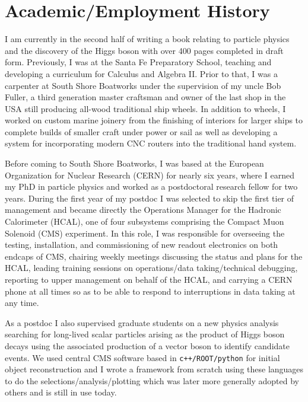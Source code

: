 \documentclass[10pt]{article} %
\begin{document}
\section{Academic/Employment History}

I am currently in the second half of writing a book relating to particle physics and the discovery of the Higgs boson with over 400 pages completed in draft form. Previously, I was at the Santa Fe Preparatory School, teaching and developing a curriculum for Calculus and Algebra II. Prior to that, I was a carpenter at South Shore Boatworks under the supervision of my uncle Bob Fuller, a third generation master craftsman and owner of the last shop in the USA still producing all-wood traditional ship wheels. In addition to wheels, I worked on custom marine joinery from the finishing of interiors for larger ships to complete builds of smaller craft under power or sail as well as developing a system for incorporating modern CNC routers into the traditional hand system.

\vspace{5pt}

Before coming to South Shore Boatworks, I was based at the European Organization for Nuclear Research (CERN) for nearly six years, where I earned my PhD in particle physics and worked as a postdoctoral research fellow for two years. During the first year of my postdoc I was selected to skip the first tier of management and became directly the Operations Manager for the Hadronic Calorimeter (HCAL), one of four subsystems comprising the Compact Muon Solenoid (CMS) experiment. In this role, I was responsible for overseeing the testing, installation, and commissioning of new readout electronics on both endcaps of CMS, chairing weekly meetings discussing the status and plans for the HCAL, leading training sessions on operations/data taking/technical debugging, reporting to upper management on behalf of the HCAL, and carrying a CERN phone at all times so as to be able to respond to interruptions in data taking at any time. 

\vspace{5pt}

As a postdoc I also supervised graduate students on a new physics analysis searching for long-lived scalar particles arising as the product of Higgs boson decays using the associated production of a vector boson to identify candidate events. We used central CMS software based in \texttt{c++/ROOT/python} for initial object reconstruction and I wrote a framework from scratch using these languages to do the selections/analysis/plotting which was later more generally adopted by others and is still in use today.
\end{document}
